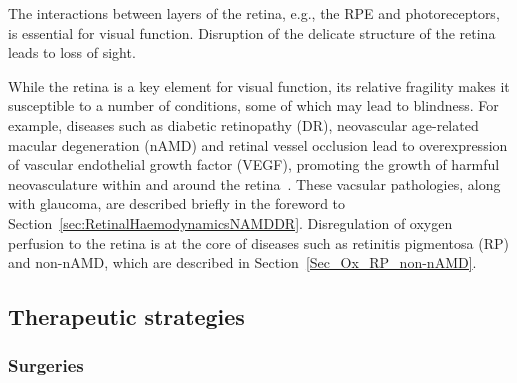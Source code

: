 \documentclass{article}
\begin{document}
The interactions between layers of the retina, e.g., the RPE and photoreceptors, is essential for visual function.
Disruption of the delicate structure of the retina leads to loss of sight.

While the retina is a key element for visual function, its relative fragility makes it susceptible to a number of conditions, some of which may lead to blindness.
For example, diseases such as diabetic retinopathy (DR), neovascular age-related macular degeneration (nAMD) and retinal vessel occlusion lead to overexpression of vascular endothelial growth factor (VEGF), promoting the growth of harmful neovasculature within and around the retina~\cite{Medina_2016}.
These vacsular pathologies, along with glaucoma, are described briefly in the foreword to Section~\ref{sec:RetinalHaemodynamicsNAMDDR}.
Disregulation of oxygen perfusion to the retina is at the core of diseases such as retinitis pigmentosa (RP) and non-nAMD, which are described in Section~\ref{Sec_Ox_RP_non-nAMD}.

\subsection{Therapeutic strategies}

\subsubsection{Surgeries}


\end{document}
